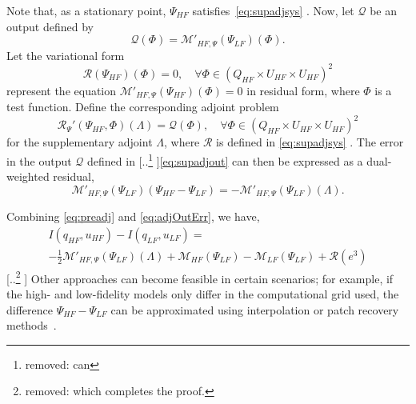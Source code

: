 \documentclass[review]{siamart0516}
\providecommand{\DIFaddtex}[1]{{\protect\color{blue} \sf #1}} %
\providecommand{\DIFdeltex}[1]{{\protect\color{red} [..\footnote{removed: #1} ]}} %
\providecommand{\DIFaddbegin}{} %
\providecommand{\DIFaddend}{} %
\providecommand{\DIFdelbegin}{} %
\providecommand{\DIFdelend}{} %
\providecommand{\DIFadd}[1]{\texorpdfstring{\DIFaddtex{#1}}{#1}} %
\providecommand{\DIFdel}[1]{\texorpdfstring{\DIFdeltex{#1}}{}} %
\newcommand{\DIFscaledelfig}{0.5}
\newlength{\DIFdelgraphicswidth} %
\newlength{\DIFdelgraphicsheight} %
\newcommand{\DIFaddincludegraphics}[2][]{{\color{blue}\fbox{\DIFOincludegraphics[#1]{#2}}}} %
\newcommand{\DIFdelincludegraphics}[2][]{%
\sbox{\DIFdelgraphicsbox}{\DIFOincludegraphics[#1]{#2}}%
\settoboxwidth{\DIFdelgraphicswidth}{\DIFdelgraphicsbox} %
\settoboxtotalheight{\DIFdelgraphicsheight}{\DIFdelgraphicsbox} %
\scalebox{\DIFscaledelfig}{%
\parbox[b]{\DIFdelgraphicswidth}{\usebox{\DIFdelgraphicsbox}\\[-\baselineskip] \rule{\DIFdelgraphicswidth}{0em}}\llap{\resizebox{\DIFdelgraphicswidth}{\DIFdelgraphicsheight}{%
\setlength{\unitlength}{\DIFdelgraphicswidth}%
\begin{picture}(1,1)%
\thicklines\linethickness{2pt} %
{\color[rgb]{1,0,0}\put(0,0){\framebox(1,1){}}}%
{\color[rgb]{1,0,0}\put(0,0){\line( 1,1){1}}}%
{\color[rgb]{1,0,0}\put(0,1){\line(1,-1){1}}}%
\end{picture}%
}\hspace*{3pt}}} %
} %
\DeclareRobustCommand{\DIFaddbegin}{\DIFOaddbegin \let\includegraphics\DIFaddincludegraphics} %
\DeclareRobustCommand{\DIFaddend}{\DIFOaddend \let\includegraphics\DIFOincludegraphics} %
\DeclareRobustCommand{\DIFdelbegin}{\DIFOdelbegin \let\includegraphics\DIFdelincludegraphics} %
\DeclareRobustCommand{\DIFdelend}{\DIFOaddend \let\includegraphics\DIFOincludegraphics} %
\begin{document}
\DIFadd{Note that, as a stationary point, $\Psi_{HF}$ satisfies~}\cref{eq:supadjsys}\DIFadd{. Now, let $\mathcal{Q}$ be an output defined by
}\begin{equation}
\mathcal{Q}(\Phi)=\mathcal{M}'_{HF,\Psi}(\Psi_{LF})(\Phi).
\label{eq:supadjout}
\end{equation}
\DIFadd{Let the variational form
}\begin{equation}
\mathscr{R}(\Psi_{HF})(\Phi)=0,\quad\forall\Phi\in(Q_{HF}\times U_{HF}\times U_{HF})^2
\label{eq:supadjsys}
\end{equation}
\DIFadd{represent the equation $\mathcal{M}'_{HF,\Psi}(\Psi_{HF})(\Phi)=0$ in residual form, where $\Phi$ is a test function. Define the corresponding adjoint problem
}\begin{equation}
\mathscr{R}_{\Psi}'(\Psi_{HF},\Phi)(\Lambda)=\mathcal{Q}(\Phi),\quad\forall\Phi\in(Q_{HF}\times U_{HF}\times U_{HF})^2
\label{eq:superAdjEq}
\end{equation}
\DIFadd{for the supplementary adjoint $\Lambda$, where $\mathscr{R}$ is defined in }\cref{eq:supadjsys}\DIFadd{. The }\DIFaddend error in the output $\mathcal{Q}$ defined in \DIFdelbegin %
\DIFdel{can }\DIFdelend \DIFaddbegin \cref{eq:supadjout} \DIFadd{can then }\DIFaddend be expressed as a dual-weighted residual,
\begin{equation}
\label{eq:adjOutErr}
\mathcal M'_{HF,\Psi}(\Psi_{LF})(\Psi_{HF}-\Psi_{LF})=-\mathcal{M}'_{HF,\Psi}(\Psi_{LF})(\Lambda).
\end{equation}
\DIFdelbegin %

\DIFdelend %
Combining \cref{eq:preadj} and \cref{eq:adjOutErr}, we have,
\DIFdelbegin %
\DIFdelend \DIFaddbegin \begin{multline}
\label{eq:finErrExp}
I(q_{HF},u_{HF})-I(q_{LF},u_{LF})=\\-\frac{1}{2}\mathcal{M}'_{HF,\Psi}(\Psi_{LF})(\Lambda)+\mathcal M_{HF}(\Psi_{LF})-\mathcal M_{LF}(\Psi_{LF})+\mathcal{R}(e^3)
\end{multline}
\DIFaddend %
\DIFdelbegin \DIFdel{which completes the proof.
}%
\DIFdelend \DIFaddbegin \DIFadd{Other approaches can become feasible in certain scenarios; for example, if the high- and low-fidelity models only differ in the computational grid used, the difference $\Psi_{HF}-\Psi_{LF}$ can be approximated using interpolation or patch recovery methods~\cite{BecVex05}.
}\DIFaddend 
\end{document}
